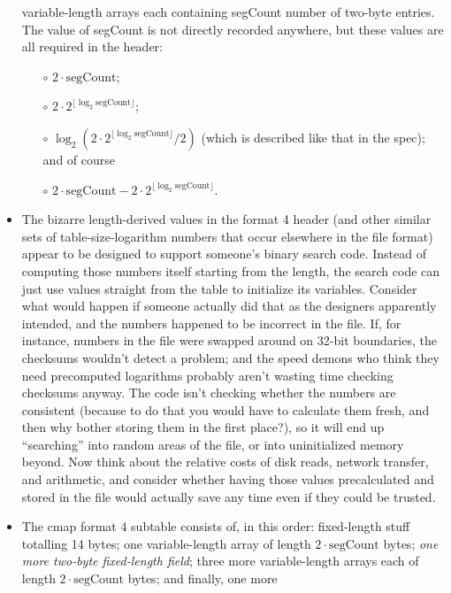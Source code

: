 \documentclass[twocolumn]{report}
\begin{document}
\begin{itemize}
    variable-length arrays each containing segCount
    number of two-byte entries.  The value of segCount is not directly
    recorded anywhere, but these values are all required
    in the header:
    \begin{itemize}
      \item[$\circ$] $2 \cdot \textrm{segCount}$;
      \item[$\circ$] $2 \cdot 2^{\lfloor \log_2 \textrm{segCount} \rfloor}$;
      \item[$\circ$] $\log_2 (2 \cdot 2^{\lfloor \log_2 \textrm{segCount}
        \rfloor}/2)$ (which is described like that in the spec);
        and of course
      \item[$\circ$] $2 \cdot \textrm{segCount}-2 \cdot 2^{\lfloor \log_2
        \textrm{segCount} \rfloor}$.
    \end{itemize}
  \item The bizarre length-derived values in the format 4 header (and
    other similar sets of table-size-logarithm numbers that occur
    elsewhere in the file format) appear to be designed to support
    someone's binary search code.  Instead of computing those numbers
    itself starting from the length, the search code can just use
    values straight from the table to initialize its variables.
    Consider what would happen if someone actually did that as the
    designers apparently intended, and the numbers happened to be incorrect
    in the file.  If, for instance, numbers in the file were swapped
    around on 32-bit boundaries, the checksums wouldn't detect a problem; and
    the speed demons who think they need precomputed logarithms
    probably aren't wasting time checking checksums anyway.
    The code isn't checking whether the numbers are consistent (because
    to do that you would have to calculate them fresh, and then why bother
    storing them in the first place?), so it will end up ``searching'' into
    random areas of the file, or into uninitialized memory beyond.  Now
    think about the relative costs of disk reads, network transfer, and
    arithmetic, and consider whether having those values precalculated
    and stored in the file would actually save any time even if they
    could be trusted.
  \item The cmap format 4 subtable consists of, in this order: fixed-length
    stuff totalling 14 bytes; one variable-length array of length $2
    \cdot \textrm{segCount}$ bytes; \emph{one more two-byte
    fixed-length field}; three more variable-length arrays each of
    length $2 \cdot \textrm{segCount}$ bytes; and finally, one more

\end{itemize}
\end{document}
